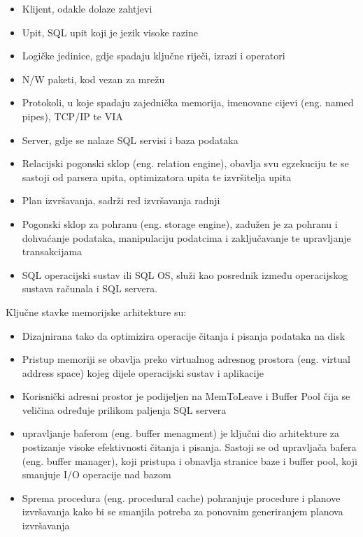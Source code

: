\documentclass[12pt, oneside, onecolumn]{book}
\begin{document}
{\begin{itemize}
\item Klijent, odakle dolaze zahtjevi
\item Upit, SQL upit koji je jezik visoke razine
\item Logičke jedinice, gdje spadaju ključne riječi, izrazi i operatori
\item N/W paketi, kod vezan za mrežu
\item Protokoli, u koje spadaju zajednička memorija, imenovane cijevi (eng. named pipes), TCP/IP te VIA
\item Server, gdje se nalaze SQL servisi i baza podataka
\item Relacijski pogonski sklop (eng. relation engine), obavlja svu egzekuciju te se sastoji od parsera upita, optimizatora upita te izvršitelja upita
\item Plan izvršavanja, sadrži red izvršavanja radnji
\item Pogonski sklop za pohranu (eng. storage engine), zadužen je za pohranu i dohvaćanje podataka, manipulaciju podatcima i zaključavanje te upravljanje transakcijama
\item SQL operacijski sustav ili SQL OS, služi kao posrednik između operacijskog sustava računala i SQL servera.
\end{itemize}

\pagebreak

Ključne stavke memorijske arhitekture su:

\begin{itemize}
\item Dizajnirana tako da optimizira operacije čitanja i pisanja podataka na disk
\item Pristup memoriji se obavlja preko virtualnog adresnog prostora (eng. virtual address space) kojeg dijele operacijski sustav i aplikacije
\item Korisnički adresni prostor je podijeljen na MemToLeave i Buffer Pool čija se veličina određuje prilikom paljenja SQL servera
\item upravljanje baferom (eng. buffer menagment) je ključni dio arhitekture za postizanje visoke efektivnosti čitanja i pisanja. Sastoji se od upravljača bafera (eng. buffer manager), koji pristupa i obnavlja stranice baze i buffer pool, koji smanjuje I/O operacije nad bazom
\item Sprema procedura (eng. procedural cache) pohranjuje procedure i planove izvršavanja kako bi se smanjila potreba za ponovnim generiranjem planova izvršavanja
\end{itemize}

}
\end{document}
